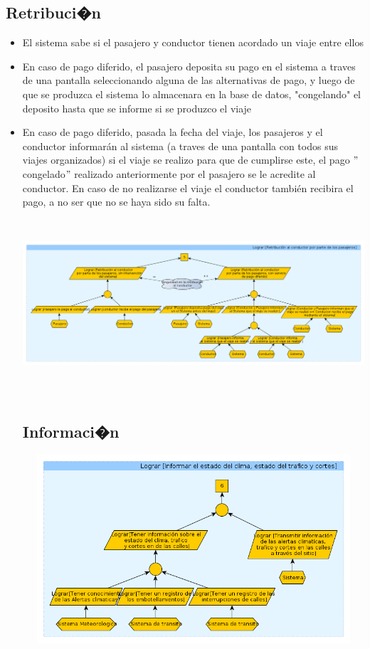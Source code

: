 \documentclass[a4paper,titlepage,10pt]{article}
\begin{document}
\subsection{Retribuci�n}
\begin{itemize}
\item El sistema sabe si el pasajero y conductor tienen acordado un viaje entre ellos
\item En caso de pago diferido, el pasajero deposita su pago en el sistema a traves de una pantalla seleccionando alguna de las alternativas de pago, y luego de que se produzca el sistema lo almacenara en la base de datos, "congelando" el deposito hasta que se informe si se produzco el viaje
\item En caso de pago diferido, pasada la fecha del viaje, los pasajeros y el conductor informarán al sistema (a traves de una pantalla con todos sus viajes organizados) si el viaje se realizo para que de cumplirse este, el pago $"$congelado$"$ realizado anteriormente por el pasajero se le acredite al conductor. En caso de no realizarse el viaje el conductor también recibira el pago, a no ser que no se haya sido su falta.
\includegraphics[height=7cm,width=19.5cm]{imagenes/Retribucion.png}

\subsection{Informaci�n}
\includegraphics[height=7cm,width=19.5cm]{imagenes/InformacionDelClimayViajes.png}




\end{itemize}
\end{document}
